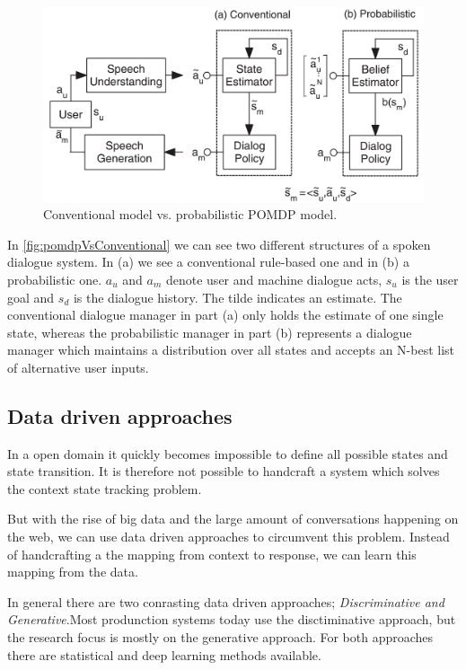 \documentclass[conference]{IEEEtran}
\begin{document}
\begin{figure}[H]
\centering
   \includegraphics[width=\linewidth]{probabilisticVsConventionalModel.jpg}
  \caption{Conventional model vs. probabilistic POMDP model\cite{young2010hidden}.}
  \label{fig:pomdpVsConventional}
\end{figure}

In \autoref{fig:pomdpVsConventional} we can see two different structures of a spoken dialogue system. In (a) we see a conventional rule-based one and in (b) a probabilistic one. $a_{u}$ and $a_{m}$ denote user and machine dialogue acts, $s_{u}$ is the user goal and $s_{d}$ is the dialogue history. The tilde indicates an estimate.
The conventional dialogue manager in part (a) only holds the estimate of one single state, whereas the probabilistic manager in part (b) represents a dialogue manager which maintains a distribution over all states and accepts an N-best list of alternative user inputs\cite{young2010hidden}.  

\subsection{Data driven approaches}
In a open domain it quickly becomes impossible to define all possible states and state transition. It is therefore not possible to handcraft a system which solves the context state tracking problem\cite{radlinski2017theoretical}.

But with the rise of big data and the large amount of conversations happening on the web, we can use data driven approaches to circumvent this problem. Instead of handcrafting a the mapping from context to response, we can learn this mapping from the data.

In general there are two conrasting data driven approaches; \emph{Discriminative and Generative}.Most produnction systems today use the disctiminative approach, but the research focus is mostly on the generative approach. For both approaches there are statistical and deep learning methods available\cite{yan2016shall}.
\end{document}
